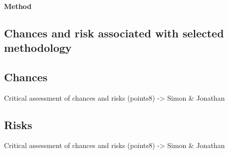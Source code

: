 \documentclass[11pt]{article}
\begin{document}
\paragraph{Method}



\subsection{Chances and risk associated with selected methodology}\label{risk}
\subsection{Chances}
Critical assessment of chances and risks (points8) -> Simon \& Jonathan
\subsection{Risks}
Critical assessment of chances and risks (points8) -> Simon \& Jonathan
\end{document}
